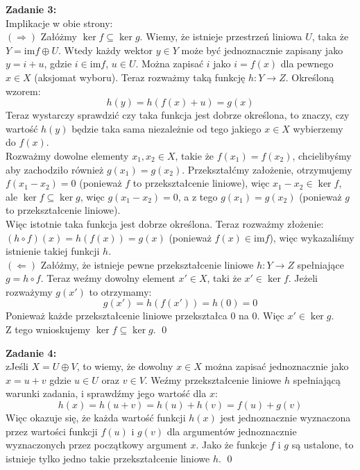 \documentclass[11pt]{article}
\begin{document}
\newpage

\textbf{Zadanie 3:} \\[10pt]
Implikacje w obie strony: \\[5pt]
$(\Longrightarrow)$ Załóżmy $\ker f \subseteq \ker g$. Wiemy, że istnieje przestrzeń liniowa $U$, taka że $Y = \mathrm{im} f \oplus U$. Wtedy każdy wektor $y \in Y$ może być jednoznacznie zapisany jako $y = i + u$, gdzie $i \in \mathrm{im} f$, $u \in U$. Można zapisać $i$ jako $i = f(x)$ dla pewnego $x \in X$ (aksjomat wyboru). Teraz rozważmy taką funkcję $h \colon Y \to Z$. Określoną wzorem:
$$h(y) = h(f(x) + u) = g(x)$$
Teraz wystarczy sprawdzić czy taka funkcja jest dobrze określona, to znaczy, czy wartość $h(y)$ będzie taka sama niezależnie od tego jakiego $x \in X$ wybierzemy do $f(x)$. \\[5pt]
Rozważmy dowolne elementy $x_1, x_2 \in X$, takie że $f(x_1) = f(x_2)$, chcielibyśmy aby zachodziło również $g(x_1) = g(x_2)$. Przekształćmy założenie, otrzymujemy $f(x_1 - x_2) = 0$ (ponieważ $f$ to przekształcenie liniowe), więc $x_1 - x_2 \in \ker f$, ale $\ker f \subseteq \ker g$, więc $g(x_1 - x_2) = 0$, a z tego $g(x_1) = g(x_2)$ (ponieważ $g$ to przekształcenie liniowe). \\[5pt]
Więc istotnie taka funkcja jest dobrze określona. Teraz rozważmy złożenie: $(h \circ f) (x) = h(f(x)) = g(x)$ (ponieważ $f(x) \in \mathrm{im} f$), więc wykazaliśmy istnienie takiej funkcji $h$.
\\[10pt]
$(\Longleftarrow)$ Załóżmy, że istnieje pewne przekształcenie liniowe $h \colon Y \to Z$ spełniające $g = h \circ f$. Teraz weźmy dowolny element $x' \in X$, taki że $x' \in \ker f$. Jeżeli rozważymy $g(x')$ to otrzymamy:
$$g(x') = h(f(x')) = h(0) = 0$$
Ponieważ każde przekształcenie liniowe przekształca 0 na 0. Więc $x' \in \ker g$. \\
Z tego wnioskujemy $\ker f \subseteq \ker g$. \qed

\vspace{20pt}

\textbf{Zadanie 4:} \\[10pt]
zJeśli $X = U \oplus V$, to wiemy, że dowolny $x \in X$ można zapisać jednoznacznie jako $x = u + v$ gdzie $u \in U$ oraz $v \in V$. Weźmy przekształcenie liniowe $h$ spełniającą warunki zadania, i sprawdźmy jego wartość dla $x$:
$$h(x) = h(u + v) = h(u) + h(v) = f(u) + g(v)$$
Więc okazuje się, że każda wartość funkcji $h(x)$ jest jednoznacznie wyznaczona przez wartości funkcji $f(u)$ i $g(v)$ dla argumentów jednoznacznie wyznaczonych przez początkowy argument $x$. Jako że funkcje $f$ i $g$ są ustalone, to istnieje tylko jedno takie przekształcenie liniowe $h$. \qed
\end{document}
